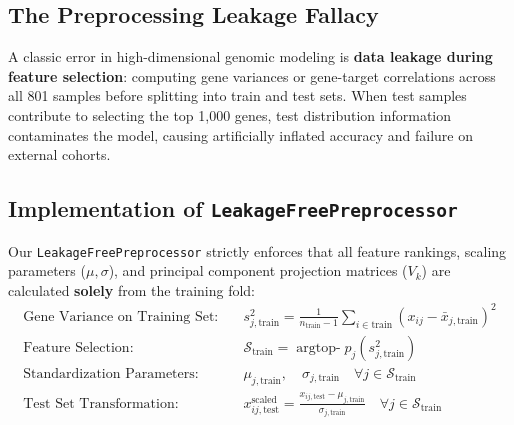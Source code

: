 \documentclass[10pt,a4paper]{article}
\begin{document}
\subsection{The Preprocessing Leakage Fallacy}
A classic error in high-dimensional genomic modeling is \textbf{data leakage during feature selection}: computing gene variances or gene-target correlations across all 801 samples before splitting into train and test sets. When test samples contribute to selecting the top 1,000 genes, test distribution information contaminates the model, causing artificially inflated accuracy and failure on external cohorts.

\subsection{Implementation of \texttt{LeakageFreePreprocessor}}
Our \texttt{LeakageFreePreprocessor} strictly enforces that all feature rankings, scaling parameters ($\mu, \sigma$), and principal component projection matrices ($V_k$) are calculated \textbf{solely} from the training fold:
\begin{align}
\text{Gene Variance on Training Set:} \quad & s_{j,\text{train}}^2 = \frac{1}{n_{\text{train}}-1} \sum_{i \in \text{train}} (x_{ij} - \bar{x}_{j,\text{train}})^2 \\
\text{Feature Selection:} \quad & \mathcal{S}_{\text{train}} = \operatorname{arg top-}p_{j} \left( s_{j,\text{train}}^2 \right) \\
\text{Standardization Parameters:} \quad & \mu_{j,\text{train}}, \quad \sigma_{j,\text{train}} \quad \forall j \in \mathcal{S}_{\text{train}} \\
\text{Test Set Transformation:} \quad & x_{i j, \text{test}}^{\text{scaled}} = \frac{x_{ij, \text{test}} - \mu_{j,\text{train}}}{\sigma_{j,\text{train}}} \quad \forall j \in \mathcal{S}_{\text{train}}
\end{align}
\end{document}
